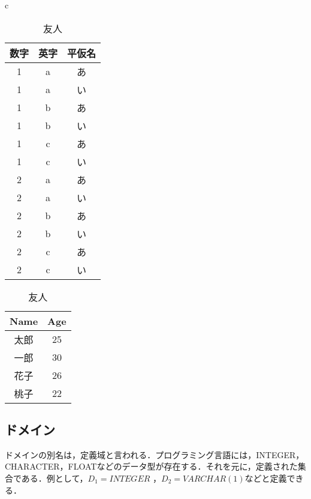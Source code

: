 \documentclass[a4paper,10pt]{jreport}
\begin{document}
\begin{table}[htp]
	\begin{center}
		\begin{tabular}{c}
			\begin{minipage}{0.5\hsize}
				\begin{center}
					\caption{リレーションのサンプル}
					\label{tbl:リレーションのサンプル}
					\begin{tabular}{|c|c|c|} \hline
						数字 & 英字 & 平仮名 \\ \hline \hline
						1 & a & あ \\ \hline
						1 & a & い \\ \hline
						1 & b & あ \\ \hline
						1 & b & い \\ \hline
						1 & c & あ \\ \hline
						1 & c & い \\ \hline
						2 & a & あ \\ \hline
						2 & a & い \\ \hline
						2 & b & あ \\ \hline
						2 & b & い \\ \hline
						2 & c & あ \\ \hline
						2 & c & い \\ \hline
					\end{tabular}
				\end{center}
			\end{minipage}
			\begin{minipage}{0.5\hsize}
				\begin{center}
					\caption{友人}
					\label{tbl:友人}
					\begin{tabular}{|c|c|}\hline
						Name & Age \\ \hline \hline
						太郎 & 25 \\ \hline
						一郎 & 30 \\ \hline
						花子 & 26 \\ \hline
						桃子 & 22 \\ \hline
					\end{tabular}
				\end{center}
			\end{minipage}
		\end{tabular}
	\end{center}
\end{table}

\subsection{ドメイン}
ドメインの別名は，定義域と言われる．プログラミング言語には，INTEGER，CHARACTER，FLOATなどのデータ型が存在する．それを元に，定義された集合である．例として，$D_1=INTEGER$ ，$D_2=VARCHAR(1)$などと定義できる．
\end{document}
